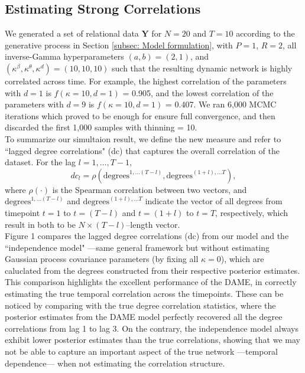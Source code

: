 \documentclass[a4paper]{article}
\begin{document}
\subsection{Estimating Strong Correlations} \label{subsec: correlation}
We generated a set of relational data $\mathbf{Y}$ for $N=20$ and $T=10$ according to the generative process in Section \ref{subsec: Model formulation}, with $P=1$, $R=2$, all inverse-Gamma hyperparameters $(a, b) = (2, 1)$, and $(\kappa^\beta, \kappa^\theta, \kappa^d) = (10, 10, 10)$ such that the resulting dynamic network is highly correlated across time. For example, the highest correlation of the parameters with $d=1$ is $f(\kappa = 10, d = 1)$ = 0.905, and the lowest correlation of the parameters with $d = 9$ is $f(\kappa = 10, d = 1)$ = 0.407. We ran 6,000 MCMC iterations which proved to be enough for ensure full convergence, and then discarded the first 1,000 samples with thinning = 10.\\\newline
To summarize our simultaion result, we define the new measure and refer to ``lagged degree correlations" (dc) that captures the overall correlation of the dataset. For the lag $l=1,\ldots, T-1$,
\begin{equation}
dc_l = \rho(\mbox{degrees}^{1,\ldots (T-l)}, \mbox{degrees}^{(1+l),\ldots T}),
\label{eqn:dc}
	\end{equation}
where $\rho(\cdot)$ is the Spearman correlation between two vectors, and $\mbox{degrees}^{1,\ldots (T-l)}$ and $\mbox{degrees}^{(1+l),\ldots T}$ indicate the vector of all degrees from timepoint $t=1$ to $t=(T-l)$ and $t=(1+l)$ to $t=T$, respectively, which result in both to be $N \times (T-l)$--length vector. \\ \newline
 Figure 1 compares the lagged degree correlations (dc) from our model and the ``independence model" ---same general framework but without estimating Gaussian process covariance parameters (by fixing all $\kappa = 0$), which are caluclated from the degrees constructed from their respective posterior estimates. This comparison highlights the excellent performance of the DAME, in correctly estimating the true temporal correlation across the timepoints. These can be noticed by comparing with the true degree correlation statistics, where the posterior estimates from the DAME model perfectly recovered all the degree correlations from lag 1 to lag 3. On the contrary, the independence model always exhibit lower posterior estimates than the true correlations, showing that we may not be able to capture an important aspect of the true network ---temporal dependence--- when not estimating the correlation structure.
\end{document}
